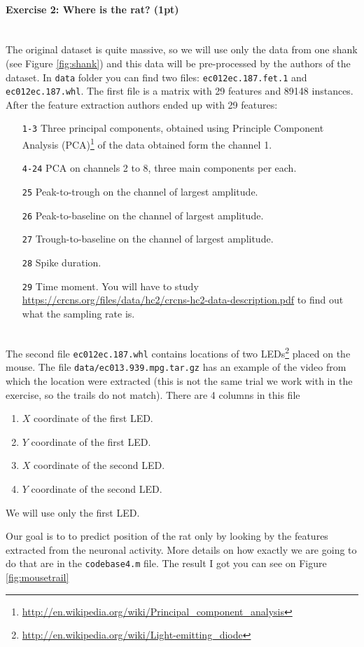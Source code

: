 \documentclass[a4paper,11pt]{article}
\newenvironment{exercise}[3]{\paragraph{Exercise #1: #2 (#3pt)}\ \\}{
\medskip}
\begin{document}
\begin{exercise}{2}{Where is the rat?}{1}
The original dataset is quite massive, so we will use only the data from one shank (see Figure \ref{fig:shank}) and this data will be pre-processed by the authors of the dataset. In \texttt{data} folder you can find two files: \texttt{ec012ec.187.fet.1} and \texttt{ec012ec.187.whl}. The first file is a matrix with 29 features and 89148 instances. After the feature extraction authors ended up with 29 features:
\begin{enumerate}[leftmargin=2cm]
\itemsep 0em
	\item [\texttt{1-3}] Three principal components, obtained using Principle Component Analysis (PCA)\footnote{\url{http://en.wikipedia.org/wiki/Principal_component_analysis}} of the data obtained form the channel 1.
	\item [\texttt{4-24}] PCA on channels 2 to 8, three main components per each.
	\item [\texttt{25}] Peak-to-trough on the channel of largest amplitude.
	\item [\texttt{26}] Peak-to-baseline on the channel of largest amplitude.
	\item [\texttt{27}] Trough-to-baseline on the channel of largest amplitude.
	\item [\texttt{28}] Spike duration.
	\item [\texttt{29}] Time moment. You will have to study \url{https://crcns.org/files/data/hc2/crcns-hc2-data-description.pdf} to find out what the sampling rate is.
\end{enumerate}
\ \\
The second file \texttt{ec012ec.187.whl} contains locations of two LEDs\footnote{\url{http://en.wikipedia.org/wiki/Light-emitting_diode}} placed on the mouse. The file \texttt{data/ec013.939.mpg.tar.gz} has an example of the video from which the location were extracted (this is not the same trial we work with in the exercise, so the trails do not match). There are 4 columns in this file
\begin{enumerate}
\itemsep 0em
	\item $X$ coordinate of the first LED.	
	\item $Y$ coordinate of the first LED.
	\item $X$ coordinate of the second LED.
	\item $Y$ coordinate of the second LED.
\end{enumerate}
We will use only the first LED.

Our goal is to to predict position of the rat only by looking by the features extracted from the neuronal activity. More details on how exactly we are going to do that are in the \texttt{codebase4.m} file. The result I got you can see on Figure \ref{fig:mousetrail}


\end{exercise}
\end{document}
